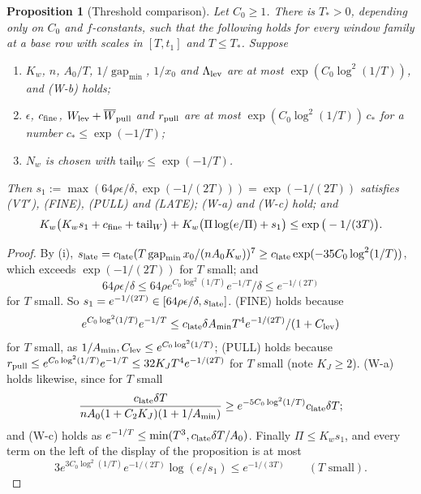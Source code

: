 \documentclass[10pt]{amsart}
\newtheorem{proposition}[theorem]{Proposition}
\theoremstyle{definition}
\theoremstyle{remark}
\newcommand{\gap}{\operatorname{gap}}
\begin{document}
\begin{proposition}[Threshold comparison]\label{prop:III-S2c}
Let $C_0\ge1$.  There is $T_*>0$, depending only on $C_0$ and
$f$-constants, such that the following holds for every window family at a base
row with scales in $[T,t_1]$ and $T\le T_*$.  Suppose
\begin{enumerate}
\item[(i)] $K_w$, $n$, $A_0/T$, $1/\gap_{\min}$, $1/x_0$ and $\Lambda_{\rm lev}$ are
at most $\exp(C_0\log^2(1/T))$, and \textup{(W-b)} holds;
\item[(ii)] $\epsilon$, $c_{\rm fine}$, $W_{\rm lev}+\overline W_{\rm pull}$ and
$r_{\rm pull}$ are at most $\exp(C_0\log^2(1/T))\,c_*$ for a number
$c_*\le\exp(-1/T)$;
\item[(iii)] $N_w$ is chosen with $\mathrm{tail}_W\le\exp(-1/T)$.
\end{enumerate}
Then $s_1:=\max(64\rho\epsilon/\delta,\exp(-1/(2T)))=\exp(-1/(2T))$ satisfies
\textup{(VT$'$)}, \textup{(FINE)}, \textup{(PULL)} and \textup{(LATE)};
\textup{(W-a)} and \textup{(W-c)} hold; and
\[
 K_w\big(K_ws_1+c_{\rm fine}+\mathrm{tail}_W\big)+K_w\big(\Pi\log(e/\Pi)+s_1\big)\le
 \exp\big(-1/(3T)\big).
\]
\end{proposition}

\begin{proof}
By (i), $s_{\rm late}=c_{\rm late}(T\gap_{\min}x_0/(nA_0K_w))^7\ge c_{\rm late}
\exp(-35C_0\log^2(1/T))$, which exceeds $\exp(-1/(2T))$ for $T$ small; and
\[
 64\rho\epsilon/\delta\le64\rho e^{C_0\log^2(1/T)}e^{-1/T}/\delta\le e^{-1/(2T)}
\]
for $T$ small.  So $s_1=e^{-1/(2T)}\in[64\rho\epsilon/\delta,s_{\rm late}]$.
(FINE) holds because
\[
 e^{C_0\log^2(1/T)}e^{-1/T}\le c_{\rm late}\delta A_{\min}T^4e^{-1/(2T)}/(1+C_{\rm lev})
\]
for $T$ small, as $1/A_{\min},C_{\rm lev}\le e^{C_0\log^2(1/T)}$; (PULL)
holds because $r_{\rm pull}\le e^{C_0\log^2(1/T)}e^{-1/T}\le32K_JT^4
e^{-1/(2T)}$ for $T$ small (note $K_J\ge2$).  (W-a) holds
likewise, since for $T$ small
\[
 \frac{c_{\rm late}\delta T}{nA_0(1+C_2K_J)(1+1/A_{\min})}\ge
 e^{-5C_0\log^2(1/T)}c_{\rm late}\delta T ;
\]
and (W-c) holds as $e^{-1/T}\le\min(T^3,c_{\rm late}\delta T/A_0)$.  Finally
$\Pi\le K_ws_1$, and every term on the left of the display of the proposition is
at most
\[
 3e^{3C_0\log^2(1/T)}e^{-1/(2T)}\log(e/s_1)\le e^{-1/(3T)}\qquad(T\text{ small}).
\]
\end{proof}
\end{document}
